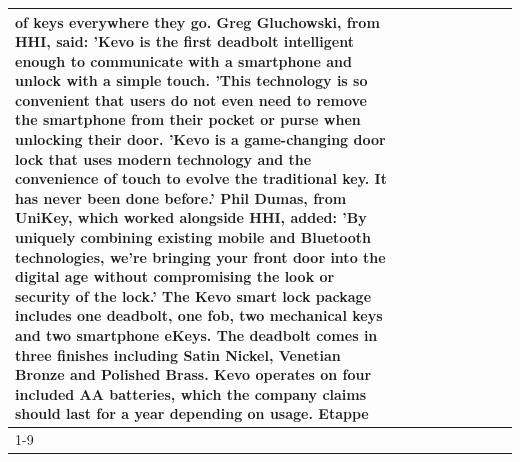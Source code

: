 \begin{table}[H]
\begin{tabular}{lllrlllll}
of keys everywhere they go. Greg Gluchowski, from HHI, said: 'Kevo is the first deadbolt intelligent enough to communicate with a smartphone and unlock with a simple touch. 'This technology is so convenient that users do not even need to remove the smartphone from their pocket or purse when unlocking their door. 'Kevo is a game-changing door lock that uses modern technology and the convenience of touch to evolve the traditional key. It has never been done before.' Phil Dumas, from UniKey, which worked alongside HHI, added: 'By uniquely combining existing mobile and Bluetooth technologies, we’re bringing your front door into the digital age without compromising the look or security of the lock.' The Kevo smart lock package includes one deadbolt, one fob, two mechanical keys and two smartphone eKeys. The deadbolt comes in three finishes including Satin Nickel, Venetian Bronze and Polished Brass. Kevo operates on four included AA batteries, which the company claims should last for a year depending on usage. Etappe \\
\cline{1-9}

\end{tabular}
\end{table}
